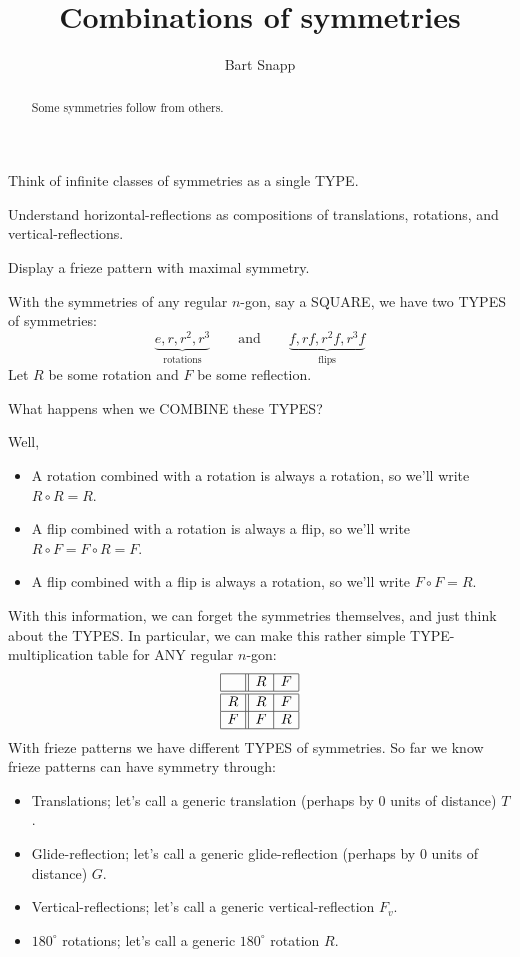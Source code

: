 \documentclass[noauthor,nooutcomes,hints        ]{ximera}
\author{Bart Snapp}
\title{Combinations of symmetries}
\begin{document}
\begin{abstract}
  Some symmetries follow from others. 
\end{abstract}
\maketitle

\begin{listOutcomes}
\item Think of infinite classes of symmetries as a single TYPE.
\item Understand horizontal-reflections as compositions of
  translations, rotations, and vertical-reflections.
\item Display a frieze pattern with maximal symmetry.
\end{listOutcomes}


With the symmetries of any regular $n$-gon, say a SQUARE, we have two TYPES of symmetries:
\[
\underbrace{e,r,r^2,r^3}_{\text{rotations}} \qquad\text{and}\qquad \underbrace{f, rf,r^2f,r^3f}_{\text{flips}}
\]
Let $R$ be some rotation and $F$ be some reflection.
\begin{center}
  What happens when we COMBINE these TYPES?
\end{center}
Well,
\begin{itemize}
\item A rotation combined with a rotation is always a rotation, so we'll write $R \circ R = R$.
\item A flip combined with a rotation is always a flip, so we'll write
  $R\circ F = F \circ R = F$.
\item A flip combined with a flip is always a rotation, so we'll
  write $F\circ F = R$.
\end{itemize}
With this information, we can forget the symmetries themselves, and
just think about the TYPES. In particular, we can make this rather
simple TYPE-multiplication table for ANY regular $n$-gon:
\[
\begin{array}{|c||c|c|}
    \hline
       & R    & F    \\ \hline\hline
    R  & R    & F    \\ \hline
    F  & F    & R    \\ \hline
\end{array}
\]
With frieze patterns we have different TYPES of symmetries. So far we
know frieze patterns can have symmetry through:
\begin{itemize}
\item Translations; let's call a generic translation (perhaps by $0$ units of distance) $T$.
\item Glide-reflection; let's call a generic glide-reflection (perhaps by $0$ units of distance) $G$.
\item Vertical-reflections; let's call a generic vertical-reflection $F_v$.
\item $180^\circ$ rotations; let's call a generic $180^\circ$
  rotation $R$.
\end{itemize}
\end{document}
